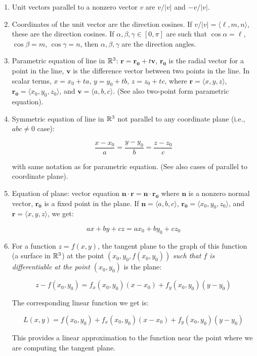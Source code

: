 \documentclass[10pt]{amsart}
\begin{document}
\begin{enumerate}

\item Unit vectors parallel to a nonzero vector $v$ are $v/|v|$ and
  $-v/|v|$.
\item Coordinates of the unit vector are the direction cosines. If
  $v/|v| = \langle \ell,m,n\rangle$, these are the direction
  cosines. If $\alpha, \beta, \gamma \in [0,\pi]$ are such that $\cos
  \alpha = \ell$, $\cos \beta = m$, $\cos \gamma = n$, then $\alpha,
  \beta, \gamma$ are the direction angles.
\item Parametric equation of line in $\mathbb{R}^3$: $\mathbf{r} =
  \mathbf{r_0} + t\mathbf{v}$, $\mathbf{r_0}$ is the radial vector for
  a point in the line, $\mathbf{v}$ is the difference vector between
  two points in the line. In scalar terms, $x = x_0 + ta$, $y = y_0 +
  tb$, $z = z_0 + tc$, where $\mathbf{r} = \langle x,y,z \rangle$,
  $\mathbf{r_0} = \langle x_0,y_0,z_0 \rangle$, and $\mathbf{v} =
  \langle a,b,c \rangle$. (See also two-point form parametric equation).
\item Symmetric equation of line in $\mathbb{R}^3$ not parallel to any
  coordinate plane (i.e., $abc \ne 0$ case):

  $$\frac{x - x_0}{a} = \frac{y - y_0}{b} = \frac{z - z_0}{c}$$

  with same notation as for parametric equation. (See also cases of
  parallel to coordinate plane).
\item Equation of plane: vector equation $\mathbf{n} \cdot \mathbf{r}
  = \mathbf{n} \cdot \mathbf{r_0}$ where $\mathbf{n}$ is a nonzero
  normal vector, $\mathbf{r_0}$ is a fixed point in the plane. If
  $\mathbf{n} = \langle a,b,c \rangle$, $\mathbf{r_0} = \langle x_0,
  y_0, z_0 \rangle$, and $\mathbf{r} = \langle x,y,z \rangle$, we get:

  $$ax + by + cz = ax_0 + by_0 + cz_0$$
\item For a function $z = f(x,y)$, the tangent plane to the graph of
  this function (a surface in $\mathbb{R}^3$) at the point
  $(x_0,y_0,f(x_0,y_0))$ {\em such that $f$ is differentiable at the
    point $(x_0,y_0)$} is the plane:

  $$z - f(x_0,y_0) = f_x(x_0,y_0)(x - x_0) + f_y(x_0,y_0)(y - y_0)$$

  The corresponding linear function we get is:

  $$L(x,y) = f(x_0,y_0) + f_x(x_0,y_0)(x - x_0) + f_y(x_0,y_0)(y - y_0)$$

  This provides a linear approximation to the function near the point
  where we are computing the tangent plane.
\end{enumerate}
\end{document}
